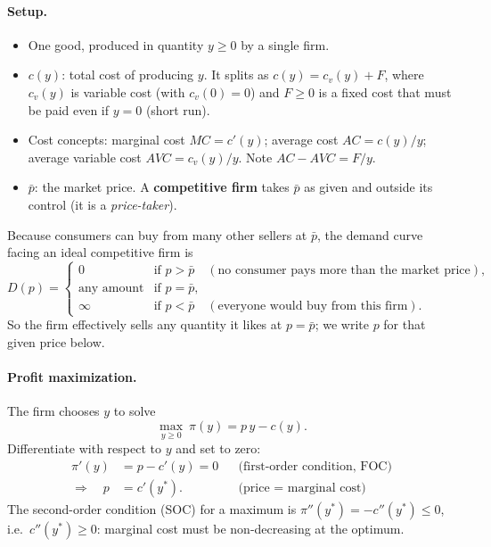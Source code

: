\paragraph{Setup.}
\begin{itemize}
\item One good, produced in quantity $y\ge 0$ by a single firm.
\item $c(y)$: total cost of producing $y$. It splits as $c(y)=c_v(y)+F$, where $c_v(y)$ is variable cost (with $c_v(0)=0$) and $F\ge 0$ is a fixed cost that must be paid even if $y=0$ (short run).
\item Cost concepts: marginal cost $MC=c'(y)$; average cost $AC=c(y)/y$; average variable cost $AVC=c_v(y)/y$. Note $AC-AVC=F/y$.
\item $\bar p$: the market price. A \textbf{competitive firm} takes $\bar p$ as given and outside its control (it is a \emph{price-taker}).
\end{itemize}

Because consumers can buy from many other sellers at $\bar p$, the demand curve facing an ideal competitive firm is
\[
D(p)=\begin{cases}0 & \text{if } p>\bar p \quad(\text{no consumer pays more than the market price}),\\[2pt] \text{any amount} & \text{if } p=\bar p,\\[2pt] \infty & \text{if } p<\bar p \quad(\text{everyone would buy from this firm}).\end{cases}
\]
So the firm effectively sells any quantity it likes at $p=\bar p$; we write $p$ for that given price below.

\paragraph{Profit maximization.} The firm chooses $y$ to solve
\begin{equation}\label{eq:micro-cf}
\max_{y\ge 0}\ \pi(y)=p\,y-c(y).
\end{equation}
Differentiate with respect to $y$ and set to zero:
\begin{align*}
\pi'(y)&=p-c'(y)=0 &&\text{(first-order condition, FOC)}\\
\Longrightarrow\quad p&=c'(y^*). &&\text{(price = marginal cost)}
\end{align*}
The second-order condition (SOC) for a maximum is $\pi''(y^*)=-c''(y^*)\le 0$, i.e.\ $c''(y^*)\ge 0$: marginal cost must be non-decreasing at the optimum.

